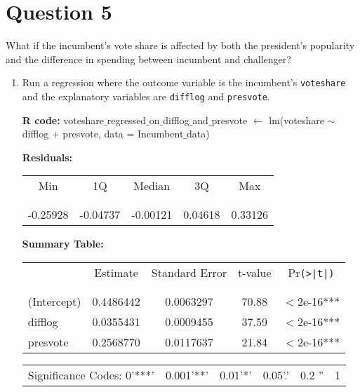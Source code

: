 \documentclass[12pt,letterpaper]{article}
\begin{document}
\section*{Question 5}
\noindent What if the incumbent's vote share is affected by both the president's popularity and the difference in spending between incumbent and challenger? 
\begin{enumerate}
	\item Run a regression where the outcome variable is the incumbent's \texttt{voteshare} and the explanatory variables are \texttt{difflog} and \texttt{presvote}.
	
	\-\hspace{0.5cm}\textbf{R code:} voteshare$\_$regressed$\_$on$\_$difflog$\_$and$\_$presvote $\gets$ lm(voteshare $\sim$ difflog + presvote, data = Incumbent$\_$data)
	
	\begin{table}[h!]
		\-\hspace{0.5cm}\textbf{Residuals:}
		\centering
		\begin{tabular}{c c c c c}
			Min & 1Q & Median & 3Q & Max \\
			\\[-1.8ex] 
			\hline \\[-1.8ex]
			-0.25928 & -0.04737 & -0.00121 & 0.04618 & 0.33126\\
		\end{tabular}
	\end{table}
	\vspace{0.5cm}
	\begin{table}[h!]
		\-\hspace{0.5cm}\textbf{Summary Table:}
		\centering
		\begin{tabular}{l | c c c c }
			& Estimate & Standard Error & t-value & Pr\texttt{(>|t|)} \\
			\\[-1.8ex] 
			\hline \\[-1.8ex]
			(Intercept) & 0.4486442 & 0.0063297 & 70.88 & $<$2e-16*** \\
			difflog & 0.0355431 & 0.0009455 & 37.59 & $<$2e-16*** \\
			presvote & 0.2568770 & 0.0117637 & 21.84& $<$2e-16*** \\
		\end{tabular}
	\end{table}
	\vspace{0.5cm}
	\begin{table}[h!]
		\centering
		\begin{tabular}{c c c c c c}
			\\[-1.8ex] 
			Significance Codes: 0'***' & 0.001'**' & 0.01'*' & 0.05'.' & 0.2 '' & 1 \\
		\end{tabular}
	\end{table}
	

\end{enumerate}
\end{document}

